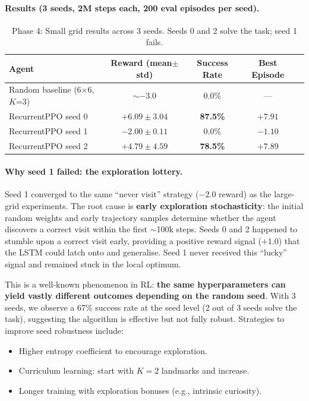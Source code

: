 \documentclass[11pt,a4paper]{article}
\begin{document}
\paragraph{Results (3 seeds, 2M steps each, 200 eval episodes per seed).}

\begin{table}[H]
\centering
\begin{tabular}{lcccc}
\toprule
\textbf{Agent} & \textbf{Reward (mean$\pm$std)} & \textbf{Success Rate}
  & \textbf{Best Episode} \\
\midrule
Random baseline (6$\times$6, $K$=3) & $\sim -3.0$ & 0.0\% & --- \\
RecurrentPPO seed 0  & $+6.09 \pm 3.04$ & \textbf{87.5\%} & $+7.91$ \\
RecurrentPPO seed 1  & $-2.00 \pm 0.11$ & 0.0\% & $-1.10$ \\
RecurrentPPO seed 2  & $+4.79 \pm 4.59$ & \textbf{78.5\%} & $+7.89$ \\
\bottomrule
\end{tabular}
\caption{Phase 4: Small grid results across 3 seeds. Seeds 0 and 2 solve the task; seed 1 fails.}
\label{tab:phase4}
\end{table}

\paragraph{Why seed 1 failed: the exploration lottery.}
Seed 1 converged to the same ``never visit'' strategy ($-2.0$ reward) as the
large-grid experiments. The root cause is \textbf{early exploration
stochasticity}: the initial random weights and early trajectory samples
determine whether the agent discovers a correct visit within the first
$\sim$100k steps. Seeds 0 and 2 happened to stumble upon a correct visit
early, providing a positive reward signal ($+1.0$) that the LSTM could
latch onto and generalise. Seed 1 never received this ``lucky'' signal and
remained stuck in the local optimum.

This is a well-known phenomenon in RL: \textbf{the same hyperparameters can
yield vastly different outcomes depending on the random seed}. With 3 seeds,
we observe a 67\% success rate at the seed level (2 out of 3 seeds solve the
task), suggesting the algorithm is effective but not fully robust. Strategies
to improve seed robustness include:
\begin{itemize}[nosep]
  \item Higher entropy coefficient to encourage exploration.
  \item Curriculum learning: start with $K=2$ landmarks and increase.
  \item Longer training with exploration bonuses (e.g., intrinsic curiosity).
\end{itemize}
\end{document}
